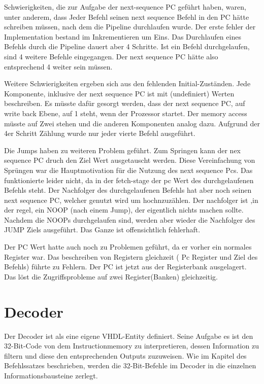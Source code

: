 \documentclass[paper=a4,fontsize=12pt,twocolumn]{scrreprt}
\begin{document}
Schwierigkeiten, die zur Aufgabe der next-sequence PC geführt haben, waren, unter anderem, dass Jeder Befehl seinen next sequence Befehl in den PC hätte schreiben müssen, nach dem die Pipeline durchlaufen wurde. 
Der erste fehler der Implementation bestand im Inkrementieren um Eins. Das Durchlaufen eines Befehls durch die Pipeline dauert aber 4 Schritte. Ist ein Befehl durchgelaufen, sind 4 weitere Befehle eingegangen. Der next sequence PC hätte also entsprechend 4 weiter sein müssen.

Weitere Schwierigkeiten ergeben sich aus den fehlenden Initial-Zuständen. Jede Komponente, inklusive der next sequence PC ist mit (undefiniert) Werten beschreiben. Es müsste dafür gesorgt werden, dass der next sequence PC, auf write back Ebene, auf 1 steht, wenn der Prozessor startet. Der memory access müsste auf Zwei stehen und die anderen Komponenten analog dazu. Aufgrund der 4er Schritt Zählung wurde nur jeder vierte Befehl ausgeführt.

Die Jumps haben zu weiteren Problem geführt. Zum Springen kann der nex sequence PC druch den Ziel Wert ausgetauscht werden. Diese Vereinfachung von Sprüngen war die Hauptmotivation für die Nutzung des next sequence Pcs.
Das funktionierte leider nicht, da in der fetch-stage der pc Wert des durchgelaufenen Befehls steht. Der Nachfolger des durchgelaufenen Befehls hat aber noch seinen next sequence PC, welcher genutzt wird um hochnzuzählen. Der nachfolger ist ,in der regel, ein NOOP (nach einem Jump), der eigentlich nichts machen sollte. Nachdem die NOOPs durchgelaufen sind, werden aber wieder die Nachfolger des JUMP Ziels ausgeführt. Das Ganze ist offensichtlich fehlerhaft.

Der PC Wert hatte auch noch zu Problemen geführt, da er vorher ein normales Register war. Das beschreiben von Registern gleichzeit ( Pc Register und Ziel des Befehls) führte zu Fehlern. Der PC ist jetzt aus der Registerbank ausgelagert. Das löst die Zugriffsprobleme auf zwei Register(Banken) gleichzeitig.


\section{Decoder}

Der Decoder ist als eine eigene VHDL-Entity definiert. Seine Aufgabe es ist den 32-Bit-Code von dem Instructionmemory zu interpretieren, dessen Information zu filtern und diese den entsprechenden Outputs zuzuweisen.
Wie im Kapitel des Befehlssatzes beschrieben, werden die 32-Bit-Befehle im Decoder in die einzelnen Informationsbausteine zerlegt.
\end{document}
